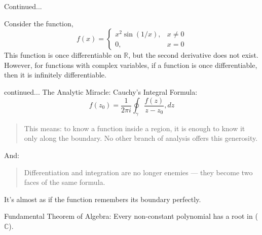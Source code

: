 \documentclass[11pt]{beamer}
\theoremstyle{plain}
\begin{document}
\begin{frame}{Continued...}
    \begin{tcolorbox}
        Consider the function, $$f(x)=\begin{cases}
            x^2\sin(1/x),&x\neq 0\\
            0, &x=0
        \end{cases}$$
        This function is once differentiable on $\mathbb R$, but the second derivative does not exist. However, for functions with complex variables, if a function is once differentiable, then it is infinitely differentiable.
    \end{tcolorbox}
\end{frame}

\begin{frame}{continued...}
The Analytic Miracle: Cauchy’s Integral Formula:
$$
f(z_0) = \frac{1}{2\pi i} \oint_{\gamma} \frac{f(z)}{z - z_0},dz
$$
\begin{quote}
    This means: to know a function inside a region, it is enough to know it only along the boundary. No other branch of analysis offers this generosity.    
\end{quote}
And:
\begin{quote}
   Differentiation and integration are no longer enemies — they become two faces of the same formula. 
\end{quote}
It’s almost as if the function remembers its boundary perfectly.
\begin{tcolorbox}
    Fundamental Theorem of Algebra: Every non-constant polynomial has a root in ($\mathbb{C}$).
\end{tcolorbox}
\end{frame}
\end{document}
